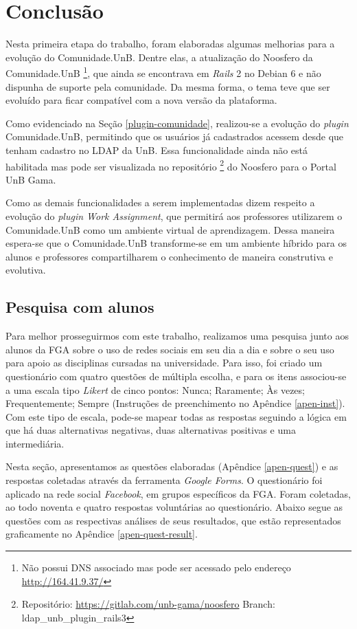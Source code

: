 \chapter{Conclusão}
\label{conclusao}

Nesta primeira etapa do trabalho, foram elaboradas algumas melhorias para a evolução do Comunidade.UnB. Dentre elas, a atualização do Noosfero da Comunidade.UnB \footnote{Não possui DNS associado mas pode ser acessado pelo endereço \url{http://164.41.9.37/}}, que ainda se encontrava em \textit{Rails} 2 no Debian 6 e não dispunha de suporte pela comunidade. Da mesma forma, o tema teve que ser evoluído para ficar compatível com a nova versão da plataforma.

Como evidenciado na Seção \ref{plugin-comunidade}, realizou-se a evolução do \textit{plugin} Comunidade.UnB, permitindo que os usuários já cadastrados acessem desde que tenham cadastro no LDAP da UnB. Essa funcionalidade ainda não está habilitada mas pode ser visualizada no repositório \footnote{Repositório: \url{https://gitlab.com/unb-gama/noosfero} Branch: ldap\_unb\_plugin\_rails3 } do Noosfero para o Portal UnB Gama.

Como as demais funcionalidades a serem implementadas dizem respeito a evolução do \textit{plugin Work Assignment}, que permitirá aos professores utilizarem o Comunidade.UnB como um ambiente virtual de aprendizagem. Dessa maneira espera-se que o Comunidade.UnB transforme-se em um ambiente híbrido para os alunos e professores compartilharem o conhecimento de maneira construtiva e evolutiva.

\section{Pesquisa com alunos}
\label{pesquisa-alunos}

Para melhor prosseguirmos com este trabalho, realizamos uma pesquisa junto aos alunos da FGA sobre o uso de redes sociais em seu dia a dia e sobre o seu uso para apoio as disciplinas cursadas na universidade. Para isso, foi criado um questionário com quatro questões de múltipla escolha, e para os itens associou-se a uma escala tipo \emph{Likert} de cinco pontos: Nunca; Raramente; Às vezes; Frequentemente; Sempre (Instruções de preenchimento no Apêndice \ref{apen-inst}). Com este tipo de escala, pode-se mapear todas as respostas seguindo a lógica em que há duas alternativas negativas, duas alternativas positivas e uma intermediária.

Nesta seção, apresentamos as questões elaboradas (Apêndice \ref{apen-quest}) e as respostas coletadas através da ferramenta \textit{Google Forms}. O questionário foi aplicado na rede social \textit{Facebook}, em grupos específicos da FGA. Foram coletadas, ao todo noventa e quatro respostas voluntárias ao questionário. Abaixo segue as questões com as respectivas análises de seus resultados, que estão representados graficamente no Apêndice \ref{apen-quest-result}.

